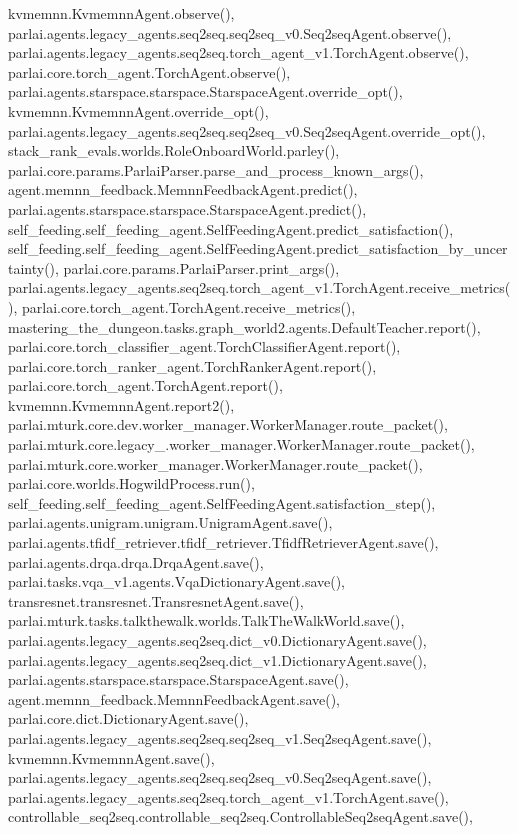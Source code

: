 kvmemnn.\+Kvmemnn\+Agent.\+observe(), parlai.\+agents.\+legacy\+\_\+agents.\+seq2seq.\+seq2seq\+\_\+v0.\+Seq2seq\+Agent.\+observe(), parlai.\+agents.\+legacy\+\_\+agents.\+seq2seq.\+torch\+\_\+agent\+\_\+v1.\+Torch\+Agent.\+observe(), parlai.\+core.\+torch\+\_\+agent.\+Torch\+Agent.\+observe(), parlai.\+agents.\+starspace.\+starspace.\+Starspace\+Agent.\+override\+\_\+opt(), kvmemnn.\+Kvmemnn\+Agent.\+override\+\_\+opt(), parlai.\+agents.\+legacy\+\_\+agents.\+seq2seq.\+seq2seq\+\_\+v0.\+Seq2seq\+Agent.\+override\+\_\+opt(), stack\+\_\+rank\+\_\+evals.\+worlds.\+Role\+Onboard\+World.\+parley(), parlai.\+core.\+params.\+Parlai\+Parser.\+parse\+\_\+and\+\_\+process\+\_\+known\+\_\+args(), agent.\+memnn\+\_\+feedback.\+Memnn\+Feedback\+Agent.\+predict(), parlai.\+agents.\+starspace.\+starspace.\+Starspace\+Agent.\+predict(), self\+\_\+feeding.\+self\+\_\+feeding\+\_\+agent.\+Self\+Feeding\+Agent.\+predict\+\_\+satisfaction(), self\+\_\+feeding.\+self\+\_\+feeding\+\_\+agent.\+Self\+Feeding\+Agent.\+predict\+\_\+satisfaction\+\_\+by\+\_\+uncertainty(), parlai.\+core.\+params.\+Parlai\+Parser.\+print\+\_\+args(), parlai.\+agents.\+legacy\+\_\+agents.\+seq2seq.\+torch\+\_\+agent\+\_\+v1.\+Torch\+Agent.\+receive\+\_\+metrics(), parlai.\+core.\+torch\+\_\+agent.\+Torch\+Agent.\+receive\+\_\+metrics(), mastering\+\_\+the\+\_\+dungeon.\+tasks.\+graph\+\_\+world2.\+agents.\+Default\+Teacher.\+report(), parlai.\+core.\+torch\+\_\+classifier\+\_\+agent.\+Torch\+Classifier\+Agent.\+report(), parlai.\+core.\+torch\+\_\+ranker\+\_\+agent.\+Torch\+Ranker\+Agent.\+report(), parlai.\+core.\+torch\+\_\+agent.\+Torch\+Agent.\+report(), kvmemnn.\+Kvmemnn\+Agent.\+report2(), parlai.\+mturk.\+core.\+dev.\+worker\+\_\+manager.\+Worker\+Manager.\+route\+\_\+packet(), parlai.\+mturk.\+core.\+legacy\+\_.\+worker\+\_\+manager.\+Worker\+Manager.\+route\+\_\+packet(), parlai.\+mturk.\+core.\+worker\+\_\+manager.\+Worker\+Manager.\+route\+\_\+packet(), parlai.\+core.\+worlds.\+Hogwild\+Process.\+run(), self\+\_\+feeding.\+self\+\_\+feeding\+\_\+agent.\+Self\+Feeding\+Agent.\+satisfaction\+\_\+step(), parlai.\+agents.\+unigram.\+unigram.\+Unigram\+Agent.\+save(), parlai.\+agents.\+tfidf\+\_\+retriever.\+tfidf\+\_\+retriever.\+Tfidf\+Retriever\+Agent.\+save(), parlai.\+agents.\+drqa.\+drqa.\+Drqa\+Agent.\+save(), parlai.\+tasks.\+vqa\+\_\+v1.\+agents.\+Vqa\+Dictionary\+Agent.\+save(), transresnet.\+transresnet.\+Transresnet\+Agent.\+save(), parlai.\+mturk.\+tasks.\+talkthewalk.\+worlds.\+Talk\+The\+Walk\+World.\+save(), parlai.\+agents.\+legacy\+\_\+agents.\+seq2seq.\+dict\+\_\+v0.\+Dictionary\+Agent.\+save(), parlai.\+agents.\+legacy\+\_\+agents.\+seq2seq.\+dict\+\_\+v1.\+Dictionary\+Agent.\+save(), parlai.\+agents.\+starspace.\+starspace.\+Starspace\+Agent.\+save(), agent.\+memnn\+\_\+feedback.\+Memnn\+Feedback\+Agent.\+save(), parlai.\+core.\+dict.\+Dictionary\+Agent.\+save(), parlai.\+agents.\+legacy\+\_\+agents.\+seq2seq.\+seq2seq\+\_\+v1.\+Seq2seq\+Agent.\+save(), kvmemnn.\+Kvmemnn\+Agent.\+save(), parlai.\+agents.\+legacy\+\_\+agents.\+seq2seq.\+seq2seq\+\_\+v0.\+Seq2seq\+Agent.\+save(), parlai.\+agents.\+legacy\+\_\+agents.\+seq2seq.\+torch\+\_\+agent\+\_\+v1.\+Torch\+Agent.\+save(), controllable\+\_\+seq2seq.\+controllable\+\_\+seq2seq.\+Controllable\+Seq2seq\+Agent.\+save(), 